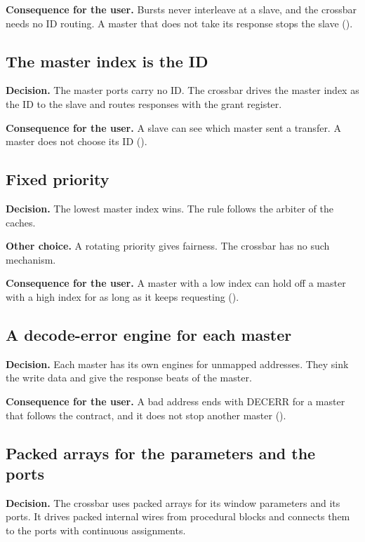 \textbf{Consequence for the user.} Bursts never interleave at a slave, and the crossbar needs no ID routing. A master that does not take its response stops the slave ().

\subsection{The master index is the ID}\label{ds:ch:mod-bus-fabric:dec-id}
\textbf{Decision.} The master ports carry no ID. The crossbar drives the master index as the ID to the slave and routes responses with the grant register.

\textbf{Consequence for the user.} A slave can see which master sent a transfer. A master does not choose its ID ().

\subsection{Fixed priority}\label{ds:ch:mod-bus-fabric:dec-priority}
\textbf{Decision.} The lowest master index wins. The rule follows the arbiter of the caches.

\textbf{Other choice.} A rotating priority gives fairness. The crossbar has no such mechanism.

\textbf{Consequence for the user.} A master with a low index can hold off a master with a high index for as long as it keeps requesting ().

\subsection{A decode-error engine for each master}\label{ds:ch:mod-bus-fabric:dec-decerr}
\textbf{Decision.} Each master has its own engines for unmapped addresses. They sink the write data and give the response beats of the master.

\textbf{Consequence for the user.} A bad address ends with DECERR for a master that follows the contract, and it does not stop another master ().

\subsection{Packed arrays for the parameters and the ports}\label{ds:ch:mod-bus-fabric:dec-packed}
\textbf{Decision.} The crossbar uses packed arrays for its window parameters and its ports. It drives packed internal wires from procedural blocks and connects them to the ports with continuous assignments.

